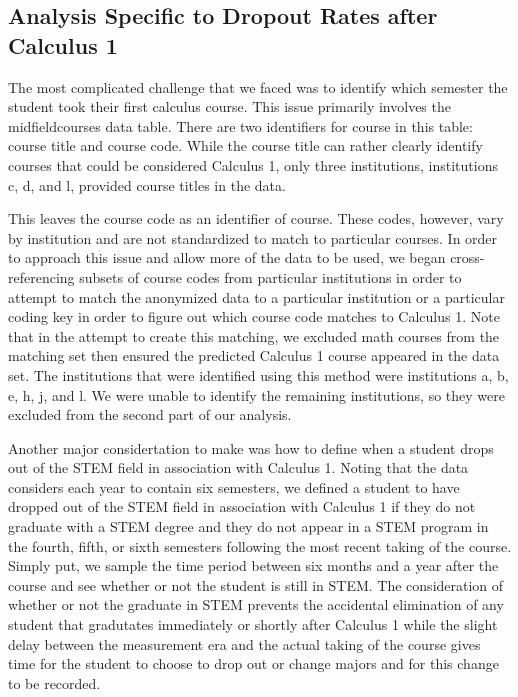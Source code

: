 \documentclass[]{article}
\begin{document}
\subsection{Analysis Specific to Dropout Rates after Calculus
1}\label{analysis-specific-to-dropout-rates-after-calculus-1}

The most complicated challenge that we faced was to identify which
semester the student took their first calculus course. This issue
primarily involves the midfieldcourses data table. There are two
identifiers for course in this table: course title and course code.
While the course title can rather clearly identify courses that could be
considered Calculus 1, only three institutions, institutions c, d, and
l, provided course titles in the data.

This leaves the course code as an identifier of course. These codes,
however, vary by institution and are not standardized to match to
particular courses. In order to approach this issue and allow more of
the data to be used, we began cross-referencing subsets of course codes
from particular institutions in order to attempt to match the anonymized
data to a particular institution or a particular coding key in order to
figure out which course code matches to Calculus 1. Note that in the
attempt to create this matching, we excluded math courses from the
matching set then ensured the predicted Calculus 1 course appeared in
the data set. The institutions that were identified using this method
were institutions a, b, e, h, j, and l. We were unable to identify the
remaining institutions, so they were excluded from the second part of
our analysis.

Another major considertation to make was how to define when a student
drops out of the STEM field in association with Calculus 1. Noting that
the data considers each year to contain six semesters, we defined a
student to have dropped out of the STEM field in association with
Calculus 1 if they do not graduate with a STEM degree and they do not
appear in a STEM program in the fourth, fifth, or sixth semesters
following the most recent taking of the course. Simply put, we sample
the time period between six months and a year after the course and see
whether or not the student is still in STEM. The consideration of
whether or not the graduate in STEM prevents the accidental elimination
of any student that gradutates immediately or shortly after Calculus 1
while the slight delay between the measurement era and the actual taking
of the course gives time for the student to choose to drop out or change
majors and for this change to be recorded.
\end{document}
